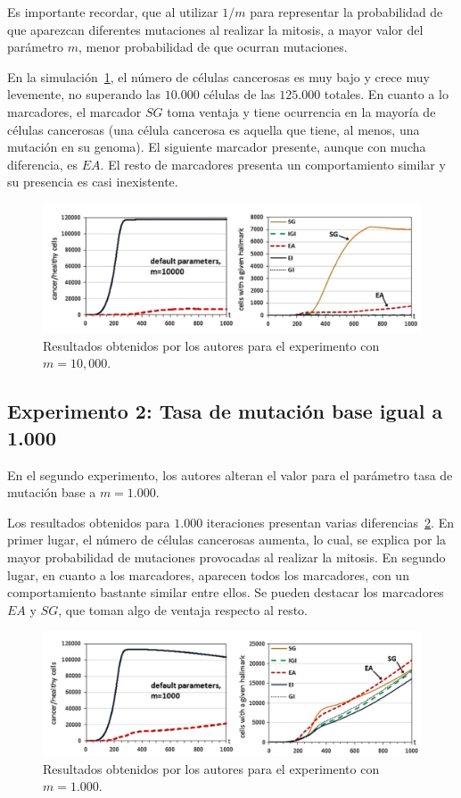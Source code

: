 Es importante recordar, que al utilizar $1/m$ para representar la probabilidad
de que aparezcan diferentes mutaciones al realizar la mitosis, a mayor valor
del parámetro $m$, menor probabilidad de que ocurran mutaciones.

En la simulación~\ref{fig:exp1}, el número de células cancerosas es muy bajo y crece muy levemente,
no superando las $10.000$ células de las $125.000$ totales. En cuanto a lo marcadores,
el marcador $SG$ toma ventaja y tiene ocurrencia en la mayoría de células cancerosas
(una célula cancerosa es aquella que tiene, al menos, una mutación en su genoma). El siguiente marcador
presente, aunque con mucha diferencia, es $EA$. El resto de marcadores presenta
un comportamiento similar y su presencia es casi inexistente.

\begin{figure}[h]
\centering
\includegraphics[scale=0.6]{figures/experiments/exp1}
\caption{Resultados obtenidos por los autores para el experimento con $m=10,000$.}
\label{fig:exp1}
\end{figure}

\subsection{Experimento 2: Tasa de mutación base igual a 1.000}

En el segundo experimento, los autores alteran el valor para el parámetro tasa de
mutación base a $m=1.000$.

Los resultados obtenidos para $1.000$ iteraciones presentan varias diferencias~\ref{fig:exp2}. En primer lugar,
el número de células cancerosas aumenta, lo cual, se explica por la mayor probabilidad
de mutaciones provocadas al realizar la mitosis. En segundo lugar, en cuanto a los marcadores,
aparecen todos los marcadores, con un comportamiento bastante similar entre ellos. Se pueden
destacar los marcadores $EA$ y $SG$, que toman algo de ventaja respecto al resto.

\begin{figure}[h]
\centering
\includegraphics[scale=0.6]{figures/experiments/exp2}
\caption{Resultados obtenidos por los autores para el experimento con $m=1.000$.}
\label{fig:exp2}
\end{figure}

